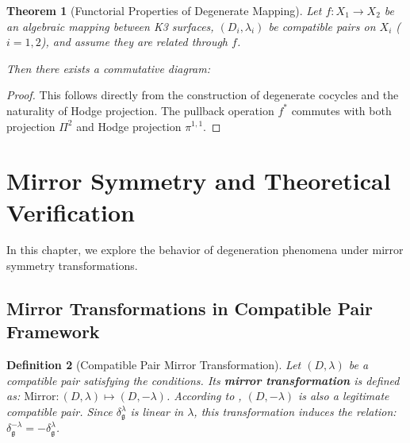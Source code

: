 \documentclass[a4paper,12pt]{extarticle}
\theoremstyle{plain}
\newtheorem{theorem}{Theorem}[section]
\newtheorem{definition}[theorem]{Definition}
\theoremstyle{definition}
\begin{document}
\begin{theorem}[Functorial Properties of Degenerate Mapping]
\label{thm:functoriality_degeneration_map}
Let $f: X_1 \to X_2$ be an algebraic mapping between K3 surfaces, $(D_i, \lambda_i)$ be compatible pairs on $X_i$ ($i = 1,2$), and assume they are related through $f$.

Then there exists a commutative diagram:
\end{theorem}

\begin{proof}
This follows directly from the construction of degenerate cocycles and the naturality of Hodge projection. The pullback operation $f^*$ commutes with both projection $\Pi^2$ and Hodge projection $\pi^{1,1}$.
\end{proof}

\section{Mirror Symmetry and Theoretical Verification}
\label{sec:zheng2025mirrormetry_and_verification}

In this chapter, we explore the behavior of degeneration phenomena under mirror symmetry transformations.

\subsection{Mirror Transformations in Compatible Pair Framework}
\label{sec:mirror_transform_compatible_pair}

\begin{definition}[Compatible Pair Mirror Transformation]
\label{def:compatible-mirror-transform}
Let $(D,\lambda)$ be a compatible pair satisfying the conditions. Its \textbf{mirror transformation} is defined as: $\mathrm{Mirror}: (D,\lambda) \mapsto (D,-\lambda)$. According to \cite{zheng2025mirror}, $(D,-\lambda)$ is also a legitimate compatible pair. Since $\delta_{\mathfrak{g}}^{\lambda}$ is linear in $\lambda$, this transformation induces the relation: $\delta^{-\lambda}_\mathfrak{g} = -\delta^\lambda_\mathfrak{g}$.
\end{definition}
\end{document}
